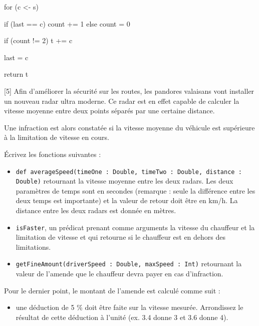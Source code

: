 \documentclass[10pt, a4paper, answers, addpoints]{\path exam}
\begin{document}
\begin{questions}
\begin{parts}
\begin{solutionordottedlines}[15cm]
\begin{scala}
{		for (c <- s) {
			if (last == c) {
				count += 1
			} else {
				count = 0
			}
			
			if (count != 2) {
				t += c
			}
		
			last = c
		}
		return t
	}	
	\end{scala}
\end{solutionordottedlines}
\end{parts}

\newpage

[5]
Afin d'améliorer la sécurité sur les routes, les pandores valaisans vont installer un nouveau radar ultra moderne. Ce radar est en effet capable de calculer la vitesse moyenne entre deux points séparés par une certaine distance. 
 
Une infraction est alors constatée si la vitesse moyenne du véhicule est supérieure à la limitation de vitesse en cours. 

Écrivez les fonctions suivantes :

\begin{itemize}
	\item \texttt{def averageSpeed(timeOne : Double, timeTwo : Double, distance : Double)} re\-tour\-nant la vi\-tes\-se moy\-en\-ne entre les deux radars. Les deux paramètres de temps sont en secondes (remarque : seule la différence entre les deux temps est importante) et la valeur de retour doit être en km/h. La distance entre les deux radars est donnée en mètres.
	
	\item \texttt{isFaster}, un prédicat prenant comme arguments la vitesse du chauffeur et la limitation de vitesse et qui retourne si le chauffeur est en dehors des limitations.
	
	\item \texttt{getFineAmount(driverSpeed : Double, maxSpeed : Int)} retournant la valeur de l'amende que le chauffeur devra payer en cas d'infraction. 
\end{itemize}

Pour le dernier point, le montant de l'amende est calculé comme suit : 
 
\begin{itemize}
	\item une déduction de 5 \% doit être faite sur la vitesse mesurée. Arrondissez le résultat de cette déduction à l'unité (ex. 3.4 donne 3 et 3.6 donne 4).
    

\end{itemize}
\end{questions}
\end{document}
